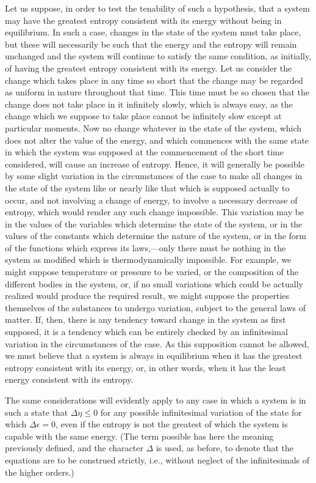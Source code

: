 \documentclass[12pt]{memoir}
\begin{document}
Let us suppose, in order to test the tenability of such a hypothesis, that a system may have the greatest entropy consistent with its energy without being in equilibrium. In such a case, changes in the state of the system must take place, but these will necessarily be such that the energy and the entropy will remain unchanged and the system will continue to satisfy the same condition, as initially, of having the greatest entropy consistent with its energy. Let us consider the change which takes place in any time so short that the change may be regarded as uniform in nature throughout that time. This time must be so chosen that the change does not take place in it infinitely slowly, which is always easy, as the change which we suppose to take place cannot be infinitely slow except at particular moments. Now no change whatever in the state of the system, which does not alter the value of the energy, and which commences with the same state in which the system was supposed at the commencement of the short time considered, will cause an increase of entropy. Hence, it will generally be possible by some slight variation in the circumstances of the case to make all changes in the state of the system like or nearly like that which is supposed actually to occur, and not involving a change of energy, to involve a necessary decrease of entropy, which would render any such change impossible. This variation may be in the values of the variables which determine the state of the system, or in the values of the constants which determine the nature of the system, or in the form of the functions which express its laws,---only there must be nothing in the system as modified which is thermodynamically impossible. For example, we might suppose temperature or pressure to be varied, or the composition of the different bodies in the system, or, if no small variations which could be actually realized would produce the required result, we might suppose the properties themselves of the substances to undergo variation, subject to the general laws of matter. If, then, there is any tendency toward change in the system as first supposed, it is a tendency which can be entirely checked by an infinitesimal variation in the circumstances of the case. As this supposition cannot be allowed, we must believe that a system is always in equilibrium when it has the greatest entropy consistent with its energy, or, in other words, when it has the least energy consistent with its entropy.

The same considerations will evidently apply to any case in which a system is in such a state that $\Delta \eta \leq 0$ for any possible infinitesimal variation of the state for which $\Delta \epsilon=0$, even if the entropy is not the greatest of which the system is capable with the same energy. (The term possible has here the meaning previously defined, and the character $\Delta$ is used, as before, to denote that the equations are to be construed strictly, i.e., without neglect of the infinitesimals of the higher orders.)
\end{document}
